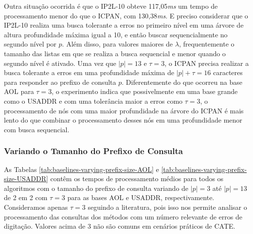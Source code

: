 Outra situação ocorrida é que o IP2L-10 obteve 117,05\textit{ms} um tempo de processamento menor do que o ICPAN, com 130,38\textit{ms}. E preciso considerar que o IP2L-10 realiza uma busca tolerante a erros no primeiro nível em uma árvore de altura profundidade máxima igual a 10, e então buscar sequencialmente no segundo nível por $p$. Além disso, para valores maiores de $\lambda$, frequentemente o tamanho das listas em que se realiza a busca sequencial e menor quando o segundo nível é ativado. Uma vez que $|p|=13$ e $\tau=3$, o ICPAN precisa realizar a busca tolerante a erros em uma profundidade máxima de $|p| + \tau = 16$ caracteres para responder ao prefixo de consulta $p$. Diferentemente do que ocorreu na base AOL para $\tau=3$, o experimento indica que possivelmente em uma base grande como o USADDR e com uma tolerância maior a erros como $\tau=3$, o processamento de nós com uma maior profundidade na árvore do ICPAN é mais lento do que combinar o processamento desses nós em uma profundidade menor com busca sequencial.


\subsubsection{Variando o Tamanho do Prefixo de Consulta}

As Tabelas \ref{tab:baselines-varying-prefix-size-AOL} e \ref{tab:baselines-varying-prefix-size-USADDR} contêm os tempos de processamento médios para todos os algoritmos com o tamanho do prefixo de consulta variando de $|p|=3$ até $|p|=13$ de 2 em 2 com $\tau=3$ para as bases AOL e USADDR, respectivamente. Consideramos apenas $\tau=3$ seguindo a literatura, pois isso nos permite analisar o processamento das consultas dos métodos com um número relevante de erros de digitação. Valores acima de 3 não são comuns em cenários práticos de CATE.


